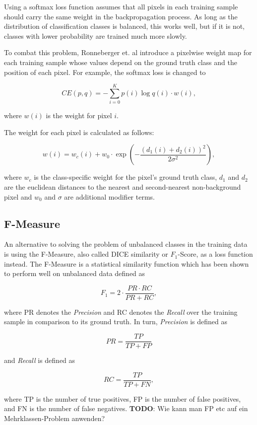 Using a softmax loss function assumes that all pixels in each training sample should carry the same weight in the backpropagation process. As long as the distribution of classification classes is balanced, this works well, but if it is not, classes with lower probability are trained much more slowly.

To combat this problem, Ronneberger et. al\cite{unet} introduce a pixelwise weight map for each training sample whose values depend on the ground truth class and the position of each pixel. For example, the softmax loss is changed to

\[CE(p, q) = -\sum \limits_{i = 0}^{K} p(i) \log q(i) \cdot w(i),\]

\noindent where $w(i)$ is the weight for pixel $i$.

 The weight for each pixel is calculated as follows:

\[ w(i) = w_c(i) + w_0 \cdot \exp \left (- \frac{(d_1(i) + d_2(i))^2}{2\sigma^2} \right ), \]

\noindent where $w_c$ is the class-specific weight for the pixel's ground truth class, $d_1$ and $d_2$ are the euclidean distances to the nearest and second-nearest non-background pixel and $w_0$ and $\sigma$ are additional modifier terms. 

		\subsection{F-Measure}

An alternative to solving the problem of unbalanced classes in the training data is using the F-Measure, also called DICE similarity or $F_1$-Score, as a loss function instead. The F-Measure is a statistical similarity function which has been shown to perform well on unbalanced data\cite{fmeasure1}\cite{fmeasure2}\cite{fmeasure3} defined as

\[F_1 = 2 \cdot \frac{PR \cdot RC}{PR + RC},\]

\noindent where PR denotes the \textit{Precision} and RC denotes the \textit{Recall} over the training sample in comparison to its ground truth. In turn, \textit{Precision} is defined as

\[PR = \frac{TP}{TP + FP}\]

\noindent and \textit{Recall} is defined as

\[RC = \frac{TP}{TP + FN},\]

\noindent where TP is the number of true positives, FP is the number of false positives, and FN is the number of false negatives. \textbf{TODO}: Wie kann man FP etc auf ein Mehrklassen-Problem anwenden?

